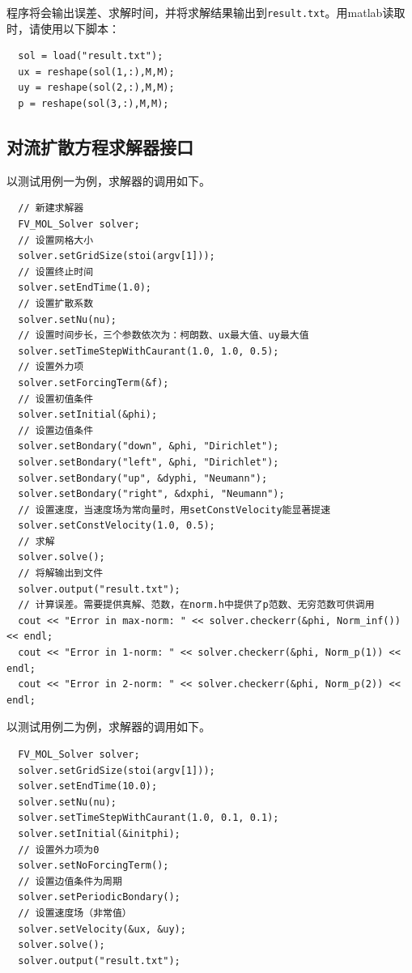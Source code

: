 \documentclass[lang=cn,10pt,bibend=bibtex]{elegantbook}
\begin{document}
程序将会输出误差、求解时间，并将求解结果输出到\verb|result.txt|。用matlab读取时，请使用以下脚本：
\begin{lstlisting}
  sol = load("result.txt");
  ux = reshape(sol(1,:),M,M);
  uy = reshape(sol(2,:),M,M);
  p = reshape(sol(3,:),M,M);
\end{lstlisting}

\subsection{对流扩散方程求解器接口}

以测试用例一为例，求解器的调用如下。

\begin{lstlisting}
  // 新建求解器
  FV_MOL_Solver solver;
  // 设置网格大小
  solver.setGridSize(stoi(argv[1]));
  // 设置终止时间
  solver.setEndTime(1.0);
  // 设置扩散系数
  solver.setNu(nu);
  // 设置时间步长，三个参数依次为：柯朗数、ux最大值、uy最大值
  solver.setTimeStepWithCaurant(1.0, 1.0, 0.5);
  // 设置外力项
  solver.setForcingTerm(&f);
  // 设置初值条件
  solver.setInitial(&phi);
  // 设置边值条件
  solver.setBondary("down", &phi, "Dirichlet");
  solver.setBondary("left", &phi, "Dirichlet");
  solver.setBondary("up", &dyphi, "Neumann");
  solver.setBondary("right", &dxphi, "Neumann");
  // 设置速度，当速度场为常向量时，用setConstVelocity能显著提速
  solver.setConstVelocity(1.0, 0.5);
  // 求解
  solver.solve();
  // 将解输出到文件
  solver.output("result.txt");
  // 计算误差。需要提供真解、范数，在norm.h中提供了p范数、无穷范数可供调用
  cout << "Error in max-norm: " << solver.checkerr(&phi, Norm_inf()) << endl;
  cout << "Error in 1-norm: " << solver.checkerr(&phi, Norm_p(1)) << endl;
  cout << "Error in 2-norm: " << solver.checkerr(&phi, Norm_p(2)) << endl;
\end{lstlisting}

以测试用例二为例，求解器的调用如下。
\begin{lstlisting}
  FV_MOL_Solver solver;
  solver.setGridSize(stoi(argv[1]));
  solver.setEndTime(10.0);
  solver.setNu(nu);
  solver.setTimeStepWithCaurant(1.0, 0.1, 0.1);
  solver.setInitial(&initphi);
  // 设置外力项为0
  solver.setNoForcingTerm();
  // 设置边值条件为周期
  solver.setPeriodicBondary();
  // 设置速度场（非常值）
  solver.setVelocity(&ux, &uy);
  solver.solve();
  solver.output("result.txt");
\end{lstlisting}
\end{document}
